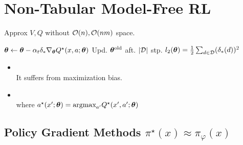 \section{Non-Tabular Model-Free RL}

\begin{definition}[Idea]
    Approx \(V, Q\) without \(\mathcal{O}(n), \mathcal{O}(nm)\) space.
\end{definition}

\begin{definition}[TD as SGD]
\end{definition}




\begin{definition}[Q-Learn. w/ F.A.]
    \(\vb*{\theta} \leftarrow \vb*{\theta} - \alpha_t \delta_* \nabla_{\vb*{\theta}} Q^\star(x, a;\vb*{\theta})\)
    Upd. \(\vb*{\theta}^{\text{old}}\) aft. \(|\mathcal{D}|\) stp. \(l_2(\vb*{\theta}) = \frac{1}{2}\sum_{d \in \mathcal{D}}(\delta_*(d))^2\)
    \begin{itemize}[leftmargin=*]
        \item \hspace{-2pt} \\ %
        It suffers from maximization bias.
        \item \hspace{-2pt} \\
        where \(a^\star(x'; \vb*{\theta}) = \text{argmax}_{a'}Q^\star(x', a';\vb*{\theta})\)
    \end{itemize}
\end{definition}

\subsection{Policy Gradient Methods \(\pi^\star(x) \approx \pi_\varphi(x)\)}

